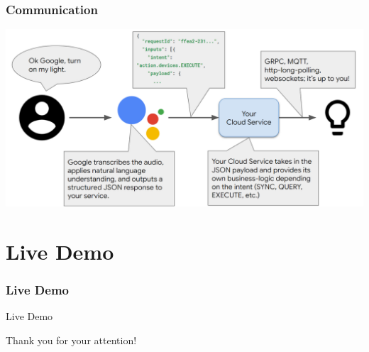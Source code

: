 \documentclass{beamer}
\begin{document}
\begin{frame}
\frametitle{Communication}
\begin{center}
\includegraphics[scale=0.22]{pictures/communication_btw.png}
\end{center}
\end{frame}


\section{Live Demo}

\begin{frame}
\frametitle{Live Demo}
\begin{center}
{\fontsize{30}{40}\selectfont Live Demo}
\end{center}
\end{frame}


\begin{frame}
\begin{center}
{\fontsize{30}{40}\selectfont Thank you for your attention!}
\end{center}
\end{frame}

\end{document}
